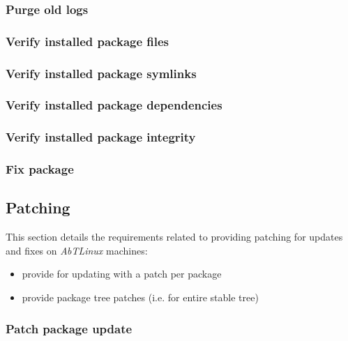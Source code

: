 \subsubsection{Purge old logs}


\subsubsection{Verify installed package files}


\subsubsection{Verify installed package symlinks}


\subsubsection{Verify installed package dependencies}


\subsubsection{Verify installed package integrity}


\subsubsection{Fix package}




\newpage
\subsection{Patching}
This section details the requirements related to providing patching for
updates and fixes on \emph{AbTLinux} machines:

\begin{itemize}
  \item provide for updating with a patch per package
  \item provide package tree patches (i.e. for entire stable tree)
\end{itemize}

%
%
\subsubsection{Patch package update}



